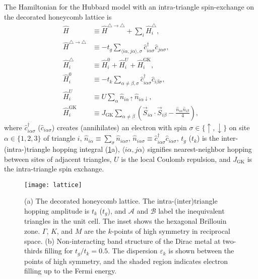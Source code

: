 \documentclass[reprint,aps,prb,amsmath,amssymb]{revtex4-2}
\begin{document}
The Hamiltonian for the Hubbard model with an intra-triangle spin-exchange on the decorated honeycomb lattice \cite{Jacko2015} is
%
\begin{align} \label{eq:ham}
\hat{H} & \equiv  \hat{H}^{\triangle \rightarrow \triangle} + \sum_i \hat{H}_i^{\triangle}, \\
%
\label{eq:ham-kin}
\hat{H}^{\triangle \rightarrow \triangle} & \equiv - t_g \sum_{\langle i \alpha, j \alpha \rangle, \sigma} \hat{c}_{i\alpha\sigma}^{\dagger} \hat{c}_{j\alpha\sigma}^{}, \\
%
\label{eq:ham-loc}
\hat{H}_i^{\triangle} & \equiv \hat{H}_i^0 + \hat{H}_i^U + \hat{H}_i^{\mathrm{GK}}, \\
%
\label{eq-ham-0}
\hat{H}_i^0 & \equiv - t_k \sum_{\alpha\neq\beta ,\sigma} \hat{c}_{i\alpha\sigma}^{\dagger} \hat{c}_{i\beta\sigma}^{}, \\
%
\label{eq:ham-U}
\hat{H}_i^U & \equiv U\sum_{\alpha} \hat{n}_{i\alpha\uparrow} \hat{n}_{i\alpha\downarrow}, \\
%
\label{eq:ham-F}
\hat{H}_i^{\mathrm{GK}} & \equiv J_{\mathrm{GK}} \sum_{\alpha \neq \beta} \left(\vec{S}_{i\alpha} \cdot \vec{S}_{i\beta}- \frac{\hat{n}_{i\alpha} \hat{n}_{i\beta}}{4} \right),
\end{align}
%
where $\hat{c}_{i\alpha\sigma}^{\dagger}$ ($\hat{c}_{i\alpha\sigma}^{}$) creates (annihilates) an electron with spin $\sigma \in \{\uparrow,\downarrow\}$ on site $\alpha \in \{1,2,3\}$ of triangle $i$, $\hat{n}_{i\alpha} \equiv \sum_{\sigma} \hat{n}_{i\alpha\sigma}$, $\hat{n}_{i\alpha\sigma} \equiv \hat{c}_{i\alpha\sigma}^{\dagger} \hat{c}_{i\alpha\sigma}^{}$, $t_g$ ($t_k$) is the inter-(intra-)triangle hopping integral (\cref{fig:lattice}a), $\langle i\alpha, j\alpha\rangle$ signifies nearest-neighbor hopping between sites of adjacent triangles, $U$ is the local Coulomb repulsion, and $J_{\mathrm{GK}}$ is the intra-triangle spin exchange.

\begin{figure}
	\centering
	\texttt{[image: lattice]}
	\caption{\label{fig:lattice}
		(a) The decorated honeycomb lattice. The intra-(inter)triangle hopping amplitude is $t_k$ ($t_g$), and $\mathcal{A}$ and $\mathcal{B}$ label the inequivalent triangles in the unit cell. The inset shows the hexagonal Brillouin zone. $\Gamma$, $K$, and $M$ are the $k$-points of high symmetry in reciprocal space.
		(b) Non-interacting band structure of the Dirac metal at two-thirds filling for $t_g/t_k = 0.5$. The dispersion $\varepsilon_k$ is shown between the points of high symmetry, and the shaded region indicates electron filling up to the Fermi energy.
	}
\end{figure}
\end{document}
